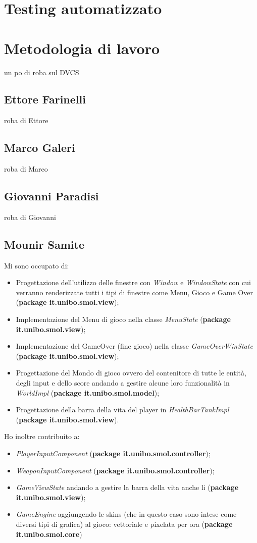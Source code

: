 \documentclass[a4paper,12pt]{report}
\begin{document}
\section{Testing automatizzato}

\section{Metodologia di lavoro}
un po di roba sul DVCS

\subsection*{Ettore Farinelli}
roba di Ettore
\subsection*{Marco Galeri}
roba di Marco
\subsection*{Giovanni Paradisi}
roba di Giovanni
\subsection*{Mounir Samite}
Mi sono occupato di:
\begin{itemize}
    \item Progettazione dell'utilizzo delle finestre con \emph{Window} e \emph{WindowState} con cui verranno renderizzate tutti i tipi di finestre come Menu, Gioco e Game Over (\textbf{package it.unibo.smol.view});
    \item Implementazione del Menu di gioco nella classe \emph{MenuState} (\textbf{package it.unibo.smol.view});
    \item Implementazione del GameOver (fine gioco) nella classe \emph{GameOverWinState} (\textbf{package it.unibo.smol.view});
    \item Progettazione del Mondo di gioco ovvero del contenitore di tutte le entità, degli input e dello score andando a gestire alcune loro funzionalità in \emph{WorldImpl} (\textbf{package it.unibo.smol.model});
    \item Progettazione della barra della vita del player in \emph{HealthBarTankImpl} (\textbf{package it.unibo.smol.view}).
\end{itemize}
Ho inoltre contribuito a:
\begin{itemize}
    \item \emph{PlayerInputComponent} (\textbf{package it.unibo.smol.controller});
    \item \emph{WeaponInputComponent} (\textbf{package it.unibo.smol.controller});
    \item \emph{GameViewState} andando a gestire la barra della vita anche li (\textbf{package it.unibo.smol.view});
    \item \emph{GameEngine} aggiungendo le skins (che in questo caso sono intese come diversi tipi di grafica) al gioco: vettoriale e pixelata per ora (\textbf{package it.unibo.smol.core}) 
\end{itemize}
\end{document}
